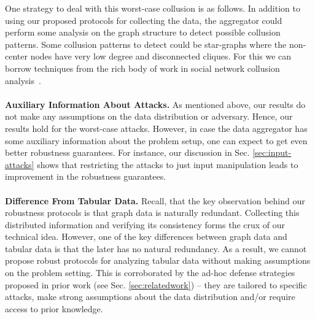 One strategy to deal with this worst-case collusion is as follows. In addition to using our proposed protocols for collecting the data, the aggregator could perform some analysis on the graph structure to detect possible collusion patterns. Some collusion patterns to detect could be star-graphs where the non-center nodes have very low degree and disconnected cliques. For this we can borrow techniques from the rich body of work in social network collusion analysis~\cite{zhang2004making, shenEnhancing2016, arora2020analyzing, dutta2022blackmarket}. \vspace{-0.2cm}  \\\\
\noindent\textbf{Auxiliary Information About Attacks.} As mentioned above, our results do not make any assumptions on the data distribution or adversary. Hence, our results hold for the worst-case attacks. However, in case the data aggregator has some auxiliary information about the problem setup, one can expect to get even better robustness guarantees. For instance, our discussion in Sec. \ref{sec:input-attacks} shows that  restricting the attacks to just input manipulation leads to improvement in the robustness guarantees.   \vspace{-0.2cm}  \\\\%
  \noindent\textbf{Difference From Tabular Data.} Recall, that the key observation behind our robustness protocols is that graph data is naturally redundant. Collecting this distributed information and verifying its consistency forms the crux of our technical idea. However, one of the key differences between graph data and tabular data is that the later has no natural redundancy. As a result, we cannot propose robust protocols for analyzing tabular data without making assumptions on the problem setting. This is corroborated by the ad-hoc defense strategies proposed in prior work (see Sec. \ref{sec:relatedwork}) -- they are tailored to specific attacks, make strong assumptions about the data distribution and/or require access to prior knowledge. 


\begin{comment}
\begin{enumerate}
    \item Tabular data; difference with tabular data defense strategies
    \item Attack info can give better guarantees
    \item Adversary collusion - no assumption about data distribution, also that $m$ is unavoidable.
\end{enumerate}
\end{comment}


